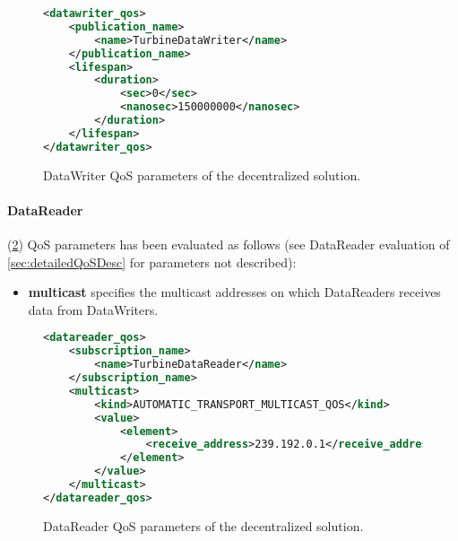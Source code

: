 \begin{figure}[!h]
\begin{lstlisting}[language=XML]
<datawriter_qos>
	<publication_name>
		<name>TurbineDataWriter</name>
	</publication_name>
	<lifespan>
		<duration>
			<sec>0</sec>
			<nanosec>150000000</nanosec>
		</duration>
	</lifespan>
</datawriter_qos>
\end{lstlisting}
\caption[Decentralized DataWriter QoS parameters]{
		\label{fig:decDataWriterQos} 
		\footnotesize{DataWriter QoS parameters of the decentralized solution.}
	}
\end{figure}

\paragraph{DataReader} (\cref{fig:decDataReaderQos}) QoS parameters has been evaluated as follows (see DataReader evaluation of \cref{sec:detailedQoSDesc} for parameters not described):

\begin{itemize}
	\item \textbf{multicast} specifies the multicast addresses on which DataReaders receives data from DataWriters. 
\end{itemize}

\begin{figure}[!h]
\begin{lstlisting}[language=XML]
<datareader_qos>
	<subscription_name>
		<name>TurbineDataReader</name>
	</subscription_name>
	<multicast>
		<kind>AUTOMATIC_TRANSPORT_MULTICAST_QOS</kind>
		<value>
			<element>
				<receive_address>239.192.0.1</receive_address>
			</element>
		</value>
	</multicast>
</datareader_qos>
\end{lstlisting}
\caption[Decentralized DataReader QoS parameters]{
		\label{fig:decDataReaderQos} 
		\footnotesize{DataReader QoS parameters of the decentralized solution.}
	}
\end{figure}